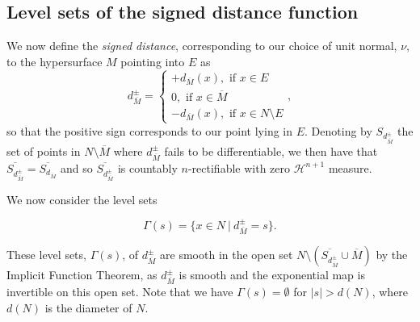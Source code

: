 \documentclass[11pt]{article}
\begin{document}
\subsection{Level sets of the signed distance function}\label{subsec: level sets of distance function}

We now define the \textit{signed distance}, corresponding to our choice of unit normal, $\nu$, to the hypersurface $M$ pointing into $E$ as
\begin{equation*}
    d^\pm_{\overline{M}} = 
    \begin{cases}
    + d_{\overline{M}} (x), \text{ if } x \in E\\
    0, \text{ if } x \in \overline{M}\\
    - d_{\overline{M}} (x), \text{ if } x \in N \setminus E
    \end{cases},
\end{equation*}
so that the positive sign corresponds to our point lying in $E$. Denoting by $S_{d^\pm_{\overline{M}}}$ the set of points in $N \setminus \overline{M}$ where $d^\pm_{\overline{M}}$ fails to be differentiable, we then have that $\overline{S_{d^\pm_{\overline{M}}}} = \overline{S_{d_{\overline{M}}}}$ and so $\overline{S_{d^\pm_{\overline{M}}}}$ is countably $n$-rectifiable with zero $\mathcal{H}^{n+1}$ measure.

\bigskip

We now consider the level sets

\begin{equation*}
    \Gamma(s) = \{ x \in N \: | \: d^\pm_{\overline{M}} = s\}.
\end{equation*}

These level sets, $\Gamma(s)$, of $d^\pm_{\overline{M}}$ are smooth in the open set $N \setminus (\overline{S_{d^\pm_{\overline{M}}}} \cup \overline{M})$ by the Implicit Function Theorem, as $d^\pm_{\overline{M}}$ is smooth and the exponential map is invertible on this open set. Note that we have $\Gamma(s) = \emptyset$ for $|s| > d(N)$, where $d(N)$ is the diameter of $N$.

\bigskip
\end{document}
